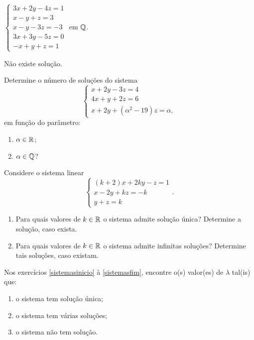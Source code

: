 \documentclass[12pt]{exam}
\begin{document}
\begin{exercicio}\label{sistema_linear_fim_gauss-jordan}
  $
    \begin{cases}
      3x + 2y - 4z = 1\\
      x - y + z = 3\\
      x - y - 3z = -3\\
      3x + 3y - 5z =0\\
      -x + y + z = 1
    \end{cases}
  $
  em $\mathbb{Q}$.
\begin{solucao}
  Não existe solução.
\end{solucao}
\end{exercicio}

\begin{exercicio}
  Determine o número de soluções do sistema
  \[
    \begin{cases}
      x + 2y - 3z = 4\\
      4x + y + 2z = 6\\
      x + 2y + (\alpha^2 - 19)z = \alpha,
    \end{cases}
\]
em função do parâmetro:
\begin{enumerate}[label={\alph*})]
   \item $\alpha \in \mathbb{R}$;
   \item $\alpha \in \mathbb{Q}$?
 \end{enumerate}
\end{exercicio}

\begin{exercicio}
  Considere o sistema linear
  \[
    \begin{cases}
      (k + 2)x + 2ky - z = 1\\
      x - 2y + kz = -k\\
      y + z = k
    \end{cases}.
  \]
  \begin{enumerate}[label={\alph*})]
    \item Para quais valores de $k \in \mathbb{R}$ o sistema admite solução única? Determine a solução, caso exista.
    \item Para quais valores de $k \in \mathbb{R}$ o sistema admite infinitas soluções? Determine tais soluções, caso existam.
  \end{enumerate}
\end{exercicio}

Nos exercícios \ref{sistemasinicio} à \ref{sistemasfim}, encontre o(s) valor(es) de $\lambda$ tal(is) que:
\begin{enumerate}[label={\alph*})]
  \item o sistema tem solução única;
  \item o sistema tem várias soluções;
  \item o sistema não tem solução.
\end{enumerate}
\end{document}
